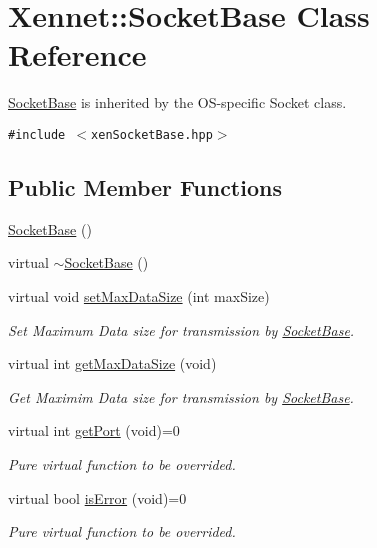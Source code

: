 \hypertarget{classXennet_1_1SocketBase}{
\section{Xennet::SocketBase Class Reference}
\label{classXennet_1_1SocketBase}
}
\hyperlink{classXennet_1_1SocketBase}{SocketBase} is inherited by the OS-specific Socket class.  


{\tt \#include $<$xenSocketBase.hpp$>$}

\subsection*{Public Member Functions}
\begin{CompactItemize}
\item 
\hyperlink{classXennet_1_1SocketBase_de4341bc034247a1ef5620914613ebbc}{SocketBase} ()
\item 
virtual \hyperlink{classXennet_1_1SocketBase_7bd3b275e3e62943c9220e56b17e146a}{$\sim$SocketBase} ()
\item 
virtual void \hyperlink{classXennet_1_1SocketBase_cfa5e4a24d42a2f02a5426aa3658a24d}{setMaxDataSize} (int maxSize)
\begin{CompactList}\small\item\em Set Maximum Data size for transmission by \hyperlink{classXennet_1_1SocketBase}{SocketBase}. \item\end{CompactList}\item 
virtual int \hyperlink{classXennet_1_1SocketBase_feee0b760a929f4cdde223713ef701db}{getMaxDataSize} (void)
\begin{CompactList}\small\item\em Get Maximim Data size for transmission by \hyperlink{classXennet_1_1SocketBase}{SocketBase}. \item\end{CompactList}\item 
virtual int \hyperlink{classXennet_1_1SocketBase_7828be0b543226b668458390a294bf0d}{getPort} (void)=0
\begin{CompactList}\small\item\em Pure virtual function to be overrided. \item\end{CompactList}\item 
virtual bool \hyperlink{classXennet_1_1SocketBase_6639e3721fda60b5859f9c87c5a79d6a}{isError} (void)=0
\begin{CompactList}\small\item\em Pure virtual function to be overrided. \item\end{CompactList}\item 

\end{CompactItemize}
